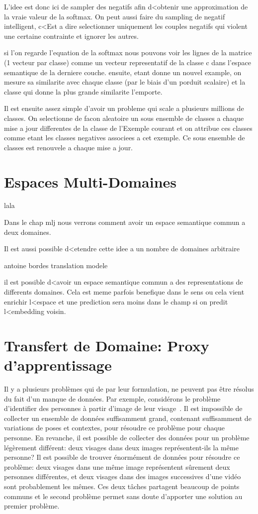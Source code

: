 L'idee est donc ici de sampler des negatifs afin d<obtenir une approximation de
la vraie valeur de la softmax.  On peut aussi faire du sampling de negatif
intelligent, c<Est a dire selectionner uniquement les couples negatifs qui
violent une certaine contrainte et ignorer les autres.

si l'on regarde l'equation de la softmax
nous pouvons voir les lignes de la matrice (1 vecteur par classe) comme un vecteur representatif de la classe c dans l'espace semantique de la derniere couche.
ensuite, etant donne un nouvel example, on mesure sa similarite avec chaque classe (par le biais d'un porduit scalaire) et la classe qui donne la plus grande similarite l'emporte.

Il est ensuite assez simple d'avoir un probleme qui scale a plusieurs millions de classes. On selectionne de facon aleatoire un sous ensemble de classes a chaque mise a jour differentes de la classe de l'Exemple courant et on attribue ces classes comme etant les classes negatives associees a cet exemple. Ce sous ensemble de classes est renouvele a chaque mise a jour.



\section{Espaces Multi-Domaines}

lala

Dans le chap mlj nous verrons comment avoir un espace semantique commun a deux domaines. 

Il est aussi possible d<etendre cette idee a un nombre de domaines arbitraire

antoine bordes translation modele

il est possible d<avoir un espace semantique commun a des representations de differents domaines. Cela est meme parfois benefique dans le sens ou cela vient enrichir l<espace et une prediction sera moins dans le champ si on predit l<embedding voisin.

\section{Transfert de Domaine: Proxy d'apprentissage}

Il y a plusieurs problèmes qui de par leur formulation, ne peuvent pas être
résolus du fait d'un manque de données. Par exemple, considérons le problème
d'identifier des personnes à partir d'image de leur visage~\citep{bottou-11}.
Il est impossible de collecter un ensemble de données suffisamment grand,
contenant suffisamment de variations de poses et contextes, pour résoudre ce
problème pour chaque personne. En revanche, il est possible de collecter des
données pour un problème légèrement différent: deux visages dans deux images
représentent-ils la même personne? Il est possible de trouver énormément de
données pour résoudre ce problème: deux visages dans une même image
représentent sûrement deux personnes différentes, et deux visages dans des
images successives d'une vidéo sont probablement les mêmes. Ces deux tâches
partagent beaucoup de points communs et le second problème permet sans doute
d'apporter une solution au premier problème. 
\\

